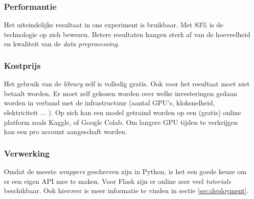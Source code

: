\subsubsection{Performantie}
\label{sucsubsec:autokeras-nfr-performantie}

Het uiteindelijke resultaat in ons experiment is bruikbaar. Met 83\% is de technologie op zich bewezen. Betere resultaten hangen sterk af van de hoeveelheid en kwaliteit van de \textit{data preprocessing}.

\subsubsection{Kostprijs}
\label{sucsubsec:autokeras-nfr-price}

Het gebruik van de \textit{library} zelf is volledig gratis. Ook voor het resultaat moet niet betaalt worden. Er moet zelf gekozen worden over welke investeringen gedaan worden in verband met de infrastructuur (aantal GPU's, kloksnelheid, elektriciteit ... ). Op zich kan een model getraind worden op een (gratis) online platform zoals Kaggle, of Google Colab. Om langere GPU tijden te verkrijgen kan een pro account aangeschaft worden.

\subsubsection{Verwerking}
\label{sucsubsec:autokeras-nfr-verwerking}

Omdat de meeste \textit{wrappers} geschreven zijn in Python, is het een goede keuze om er een eigen API mee te maken. Voor Flask zijn er online zeer veel \textit{tutorials} beschikbaar. Ook hierover is meer informatie te vinden in sectie \ref{sec:deployment}.
